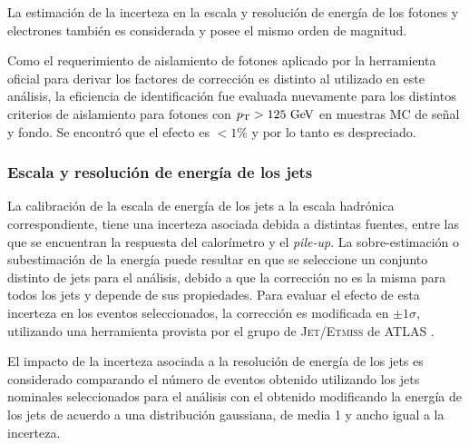 La estimación de la incerteza en la escala y resolución de energía de los fotones y
electrones \cite{EGScaleTwiki} también es considerada y posee el mismo orden de magnitud.

Como el requerimiento de aislamiento de fotones aplicado por la herramienta
oficial para derivar los factores de corrección es distinto al utilizado en este
análisis, la eficiencia de identificación fue evaluada nuevamente para los
distintos criterios de aislamiento para fotones con $\pt>125\gev$ en muestras MC
de señal y fondo. Se encontró que el efecto es $<1\%$ y por lo tanto es
despreciado.




\subsubsection{Escala y resolución de energía de los jets}

La calibración de la escala de energía de los jets a la escala hadrónica correspondiente,
tiene una incerteza asociada debida a distintas fuentes, entre las que se encuentran
la respuesta del calorímetro y el \emph{pile-up}.
La sobre-estimación o subestimación de la energía puede resultar
en que se seleccione un conjunto distinto de jets para el análisis, debido a que la corrección
no es la misma para todos los jets y depende de sus propiedades. Para evaluar el efecto
de esta incerteza en los eventos seleccionados, la corrección es modificada
en $\pm 1\sigma$, utilizando una herramienta provista por el grupo de \textsc{Jet/Etmiss}
de ATLAS \cite{JesTwiki}.

El impacto de la incerteza asociada a la resolución de energía de los jets es
considerado comparando el número de eventos obtenido utilizando los jets
nominales seleccionados para el análisis con el obtenido modificando la energía
de los jets de acuerdo a una distribución gaussiana, de media 1 y ancho igual a
la incerteza.


